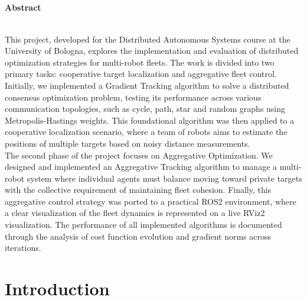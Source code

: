 \documentclass[a4paper,11pt,oneside]{book}
\begin{document}
\begin{center}
\chapter*{}
\thispagestyle{empty}
{\Huge \textbf{Abstract}}\\
\vspace{15mm}
\end{center}

\\
This project, developed for the Distributed Autonomous Systems course at the University of Bologna, explores the implementation and evaluation of distributed optimization strategies for multi-robot fleets. The work is divided into two primary tasks: cooperative target localization and aggregative fleet control.
\\
Initially, we implemented a Gradient Tracking algorithm to solve a distributed consensus optimization problem, testing its performance across various communication topologies, such as cycle, path, star and random graphs using Metropolis-Hastings weights. This foundational algorithm was then applied to a cooperative localization scenario, where a team of robots aims to estimate the positions of multiple targets based on noisy distance measurements.
\\
The second phase of the project focuses on Aggregative Optimization. We designed and implemented an Aggregative Tracking algorithm to manage a multi-robot system where individual agents must balance moving toward private targets with the collective requirement of maintaining fleet cohesion. Finally, this aggregative control strategy was ported to a practical ROS2 environment, where a clear visualization of the fleet dynamics is represented on a live RViz2 visualization. The performance of all implemented algorithms is documented through the analysis of cost function evolution and gradient norms across iterations.
 
\tableofcontents \thispagestyle{empty}
 
\chapter*{Introduction}
\end{document}
